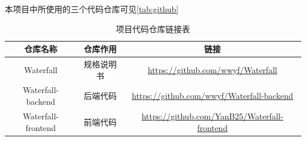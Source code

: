 本项目中所使用的三个代码仓库可见\autoref{tab:github}

\begin{table}[h] %
	\centering
        \caption{项目代码仓库链接表}
        \label{tab:github}
		\begin{tabular}{*{3}{c}}
			\toprule
	 		仓库名称 & 仓库作用  & 链接\\
            \midrule
            Waterfall & 规格说明书 & \url{https://github.com/wwyf/Waterfall} \\
            Waterfall-backend & 后端代码 & \url{https://github.com/wwyf/Waterfall-backend} \\
            Waterfall-frontend & 前端代码 & \url{https://github.com/YanB25/Waterfall-frontend} \\
			\bottomrule
		\end{tabular}
\end{table}


\endinput
